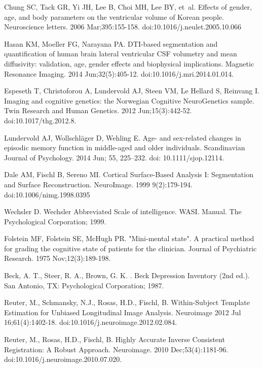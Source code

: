 \documentclass[10pt,letterpaper]{article}
\begin{document}
\begin{thebibliography}{10}
Chung SC, Tack GR, Yi JH, Lee B, Choi MH, Lee BY, et~al.
\newblock Effects of gender, age, and body parameters on the ventricular volume of Korean people.
\newblock Neuroscience letters. 2006 Mar;395:155-158. doi:10.1016/j.neulet.2005.10.066

Hasan KM, Moeller FG, Narayana PA.
\newblock DTI-based segmentation and quantification of human brain lateral ventricular CSF volumetry and mean diffusivity: validation, age, gender effects and biophysical implications.
\newblock Magnetic Resonance Imaging. 2014 Jun;32(5):405-12.
doi:10.1016/j.mri.2014.01.014.

Espeseth T, Christoforou A, Lundervold AJ, Steen VM, Le Hellard S, Reinvang I.
\newblock Imaging and cognitive genetics: the Norwegian Cognitive NeuroGenetics sample.
\newblock Twin Research and Human Genetics. 2012 Jun;15(3):442-52. doi:10.1017/thg.2012.8.

Lundervold  AJ, Wollschläger D, Wehling E.
\newblock Age- and sex-related changes in episodic memory function in middle-aged and older individuals. \newblock Scandinavian Journal of Psychology. 2014 Jun; 55, 225–232. doi: 10.1111/sjop.12114.

Dale AM, Fischl B, Sereno MI.
\newblock Cortical Surface-Based Analysis I: Segmentation and Surface Reconstruction.  
\newblock NeuroImage. 1999 9(2):179-194. doi:10.1006/nimg.1998.0395

Wechsler D.
\newblock Wechsler Abbreviated Scale of intelligence. WASI. Manual.
\newblock The Psychological Corporation; 1999.

Folstein MF, Folstein SE, McHugh PR.
\newblock "Mini-mental state". A practical method for grading the cognitive state of patients for the clinician.
\newblock Journal of Psychiatric Research. 1975 Nov;12(3):189-198.

Beck, A. T., Steer, R. A., Brown, G. K. 
\newblock. Beck Depression Inventory (2nd ed.). 
\newblock San Antonio, TX: Psychological Corporation; 1987.

Reuter, M., Schmansky, N.J., Rosas, H.D., Fischl, B. 
\newblock Within-Subject Template Estimation for Unbiased Longitudinal Image Analysis. 
\newblock Neuroimage 2012 Jul 16;61(4):1402-18. doi:10.1016/j.neuroimage.2012.02.084. 

Reuter, M., Rosas, H.D., Fischl, B.
\newblock Highly Accurate Inverse Consistent Registration: A Robust Approach. 
\newblock Neuroimage.  2010 Dec;53(4):1181-96. doi:10.1016/j.neuroimage.2010.07.020.



\end{thebibliography}
\end{document}
